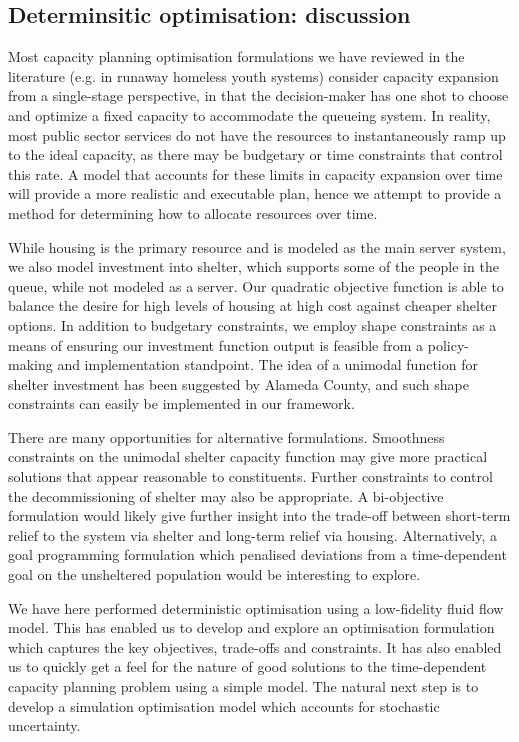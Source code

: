 \documentclass[12pt,a4paper]{article}
\begin{document}
\subsection{Determinsitic optimisation: discussion} \label{do-discuss}

Most capacity planning optimisation formulations we have reviewed in the literature (e.g. in runaway homeless youth systems) consider capacity expansion from a single-stage perspective, in that the decision-maker has one shot to choose and optimize a fixed capacity to accommodate the queueing system.   In reality, most public sector services do not have the resources to instantaneously ramp up to the ideal capacity, as there may be budgetary or time constraints that control this rate.  A model that accounts for these limits in capacity expansion over time will provide a more realistic and executable plan, hence we attempt to provide a method for determining how to allocate resources over time.

While housing is the primary resource and is modeled as the main server system, we also model investment into shelter, which supports some of the people in the queue, while not modeled as a server. Our quadratic objective function is able to balance the desire for high levels of housing at high cost against cheaper shelter options. In addition to budgetary constraints, we employ shape constraints as a means of ensuring our investment function output is feasible from a policy-making and implementation standpoint.  The idea of a unimodal function for shelter investment has been suggested by Alameda County, and such shape constraints can easily be implemented in our framework.

There are many opportunities for alternative formulations.  Smoothness constraints on the unimodal shelter capacity function may give more practical solutions that appear reasonable to constituents. Further constraints to control the decommissioning of shelter may also be appropriate. A bi-objective formulation would likely give further insight into the trade-off between short-term relief to the system via shelter and long-term relief via housing. Alternatively, a goal programming formulation which penalised deviations from a time-dependent goal on the unsheltered population would be interesting to explore.

We have here performed deterministic optimisation using a low-fidelity fluid flow model. This has enabled us to develop and explore an optimisation formulation which captures the key objectives, trade-offs and constraints. It has also enabled us to quickly get a feel for the nature of good solutions to the time-dependent capacity planning problem using a simple model. The natural next step is to develop a simulation optimisation model which accounts for stochastic uncertainty.
\end{document}
